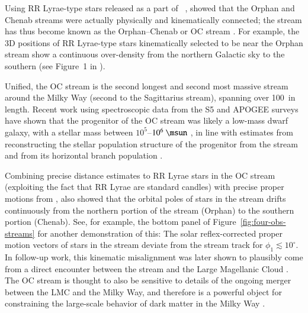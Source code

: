 \documentclass[final,5p,times,twocolumn,authoryear]{elsarticle}
\begin{document}
Using RR Lyrae-type stars released as a part of \gaia\ , \citet{koposov:2019}
showed that the Orphan and Chenab streams were actually physically and kinematically
connected; the stream has thus become known as the Orphan--Chenab or OC stream
\citep[see also][]{fardal:2019}.
For example, the 3D positions of RR Lyrae-type stars kinematically selected to be near
the Orphan stream show a continuous over-density from the northern Galactic sky to the
southern (see Figure~1 in \citealt{koposov:2019}).

Unified, the OC stream is the second longest and second most massive stream around the
Milky Way (second to the Sagittarius stream), spanning over 100~\kpc in length.
Recent work using spectroscopic data from the S5 and APOGEE surveys have shown that the
progenitor of the OC stream was likely a low-mass dwarf galaxy, with a stellar mass
between $10^5$--$10^6~\unit{\msun}$ \citep{koposov:2023, hawkins:2023}, in line with
estimates from reconstructing the stellar population structure of the progenitor from
the stream \citep{mendelsohn:2022} and from its horizontal branch population \citep{prudil:2021}.

Combining precise distance estimates to RR Lyrae stars in the OC stream (exploiting the
fact that RR Lyrae are standard candles) with precise proper motions from \gaia,
\citet{koposov:2019} also showed that the orbital poles of stars in the stream drifts
continuously from the northern portion of the stream (Orphan) to the southern portion
(Chenab).
See, for example, the bottom panel of Figure~\ref{fig:four-obs-streams} for another
demonstration of this: The solar reflex-corrected proper motion vectors of stars in the
stream deviate from the stream track for $\phi_1 \lesssim 10^\circ$.
In follow-up work, this kinematic misalignment was later shown to plausibly come from a
direct encounter between the stream and the Large Magellanic Cloud \citep{erkal:2019}.
The OC stream is thought to also be sensitive to details of the ongoing merger
between the LMC and the Milky Way, and therefore is a powerful object for constraining
the large-scale behavior of dark matter in the Milky Way \citep{lilleengen:2023}.
\end{document}
